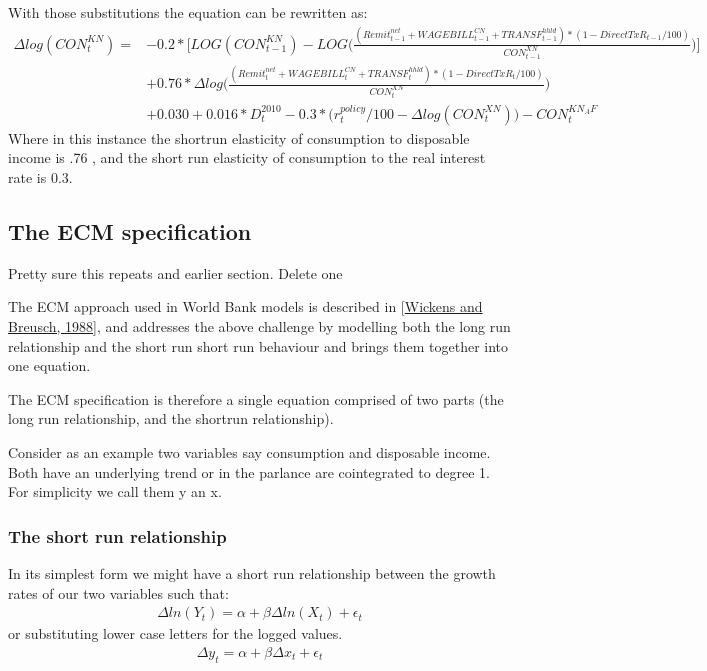 \documentclass[letterpaper,10pt,english]{jupyterBook}
\begin{document}
\sphinxAtStartPar
With those substitutions the equation can be rewritten as:
\begin{align*}
\Delta log(CON^{KN}_t) = &-0.2*\bigg[LOG(CON^{KN}_{t-1})-LOG\bigg({\frac{(Remit^{net}_{t-1}+WAGEBILL^{CN}_{t-1}+TRANSF^{hhld}_{t-1})*(1-DirectTxR_{t-1}/100)}{CON^{XN}_{t-1}}}\bigg)\bigg]  \\
&+0.76*\Delta log \bigg({\frac{(Remit^{net}_{t}+WAGEBILL^{CN}_{t}+TRANSF^{hhld}_{t})*(1-DirectTxR_{t}/100)}{CON^{XN}_{t}}}\bigg)  \\
&+0.030 + 0.016*D^{2010}_t-0.3*\bigg(r^{policy}_t/100-\Delta log(CON^{XN}_{t})\bigg) -CON^{KN_AF}_t
\end{align*}
\sphinxAtStartPar
Where in this instance the short\sphinxhyphen{}run elasticity of consumption to disposable income is .76 , and the short run elasticity of consumption to the real interest rate is 0.3.


\subsection{The ECM specification}
\label{\detokenize{content/05_WBModels/LoadingWBModel:the-ecm-specification}}
\sphinxAtStartPar
 Pretty sure this repeats and earlier section.  Delete one 

\sphinxAtStartPar
The ECM approach used in World Bank models is described in {[}\hyperlink{cite.content/99_BackMatter/References:id16}{Wickens and Breusch, 1988}{]}, and addresses the above challenge by modelling both the long run relationship and the short run short run behaviour and brings them together into one equation.

\sphinxAtStartPar
The ECM specification is therefore a single equation comprised of two parts (the long run relationship, and the short\sphinxhyphen{}run relationship).

\sphinxAtStartPar
Consider as an example two variables say consumption and disposable income.  Both have an underlying trend or in the parlance are co\sphinxhyphen{}integrated to degree 1.  For simplicity we call them y an x.


\subsubsection{The short run relationship}
\label{\detokenize{content/05_WBModels/LoadingWBModel:the-short-run-relationship}}
\sphinxAtStartPar
In its simplest form we might have a short run relationship between the growth rates of our two variables such that:
\begin{equation*}
\begin{split}\Delta ln(Y_t) = \alpha + \beta \Delta ln(X_t) +\epsilon_t\end{split}
\end{equation*}
\sphinxAtStartPar
or substituting lower case letters for the logged values.
\begin{equation*}
\begin{split}\Delta y_t = \alpha + \beta \Delta x_t +\epsilon_t\end{split}
\end{equation*}
\end{document}
